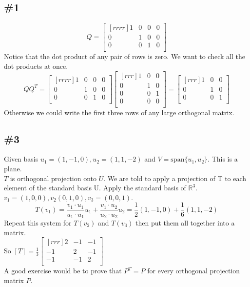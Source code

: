 \documentclass{report}
\theoremstyle{plain}
\theoremstyle{definition}
\theoremstyle{plain}
\begin{document}
\subsection{\#1}
\[ Q=\begin{bmatrix}[rrrr]1&0&0&0\\0&1&0&0\\0&0&1&0\\\end{bmatrix} \]
Notice that the dot product of any pair of rows is zero. We want to check all the dot products at once.
\[ QQ^T=\begin{bmatrix}[rrrr]1&0&0&0\\0&1&0&0\\0&0&1&0\\\end{bmatrix}\begin{bmatrix}[rrr]1&0&0\\0&1&0\\0&0&1\\0&0&0\\\end{bmatrix}=\begin{bmatrix}[rrr]1&0&0\\0&1&0\\0&0&1\\\end{bmatrix} \]
Otherwise we could write the first three rows of any large orthogonal matrix.

\subsection{\#3}
Given basis $u_1=(1,-1,0),u_2=(1,1,-2)$ and $V=\mathrm{span}\{u_1,u_2\}$. This is a plane.\\
$T$ is orthogonal projection onto $U$. We are told to apply a projection of T to each element of the standard basis U. Apply the standard basis of $\mathbb{R}^3$.\\
$v_1=(1,0,0),v_2(0,1,0),v_3=(0,0,1)$.\\
\[ T(v_1)=\frac{v_1\cdot u_1}{u_1\cdot u_1}u_1+\frac{v_1\cdot u_2}{u_2\cdot u_2}u_2 = \frac{1}{2}(1,-1,0) + \frac{1}{6}(1,1,-2) \]
Repeat this system for $T(v_2)$ and $T(v_3)$ then put them all together into a matrix.\\
So $[T]=\frac{1}{3}\begin{bmatrix}[rrr]2&-1&-1\\-1&2&-1\\-1&-1&2\\\end{bmatrix}$\\
A good exercise would be to prove that $P^T=P$ for every orthogonal projection matrix $P$.
\end{document}
